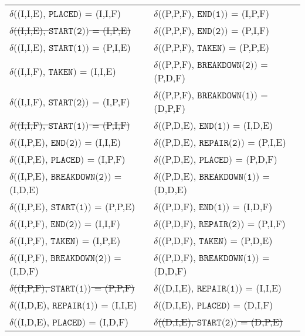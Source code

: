 \begin{table}\centering
  \begin{tabular}{ll}
    $\delta$((I,I,E), $\texttt{PLACED})$ = (I,I,F)       & $\delta$((P,P,F), $\texttt{END(1)})$ = (I,P,F)       \\
    \sout{$\delta$((I,I,E), $\texttt{START(2)})$ = (I,P,E)}     & $\delta$((P,P,F), $\texttt{END(2)})$ = (P,I,F)       \\
    $\delta$((I,I,E), $\texttt{START(1)})$ = (P,I,E)     & $\delta$((P,P,F), $\texttt{TAKEN})$ = (P,P,E)        \\
    $\delta$((I,I,F), $\texttt{TAKEN})$ = (I,I,E)        & $\delta$((P,P,F), $\texttt{BREAKDOWN(2)})$ = (P,D,F) \\
    $\delta$((I,I,F), $\texttt{START(2)})$ = (I,P,F)     & $\delta$((P,P,F), $\texttt{BREAKDOWN(1)})$ = (D,P,F) \\
    \sout{$\delta$((I,I,F), $\texttt{START(1)})$ = (P,I,F)}     & $\delta$((P,D,E), $\texttt{END(1)})$ = (I,D,E)       \\
    $\delta$((I,P,E), $\texttt{END(2)})$ = (I,I,E)       & $\delta$((P,D,E), $\texttt{REPAIR(2)})$ = (P,I,E)    \\
    $\delta$((I,P,E), $\texttt{PLACED})$ = (I,P,F)       & $\delta$((P,D,E), $\texttt{PLACED})$ = (P,D,F)       \\
    $\delta$((I,P,E), $\texttt{BREAKDOWN(2)})$ = (I,D,E) & $\delta$((P,D,E), $\texttt{BREAKDOWN(1)})$ = (D,D,E) \\
    $\delta$((I,P,E), $\texttt{START(1)})$ = (P,P,E)     & $\delta$((P,D,F), $\texttt{END(1)})$ = (I,D,F)       \\
    $\delta$((I,P,F), $\texttt{END(2)})$ = (I,I,F)       & $\delta$((P,D,F), $\texttt{REPAIR(2)})$ = (P,I,F)    \\
    $\delta$((I,P,F), $\texttt{TAKEN})$ = (I,P,E)        & $\delta$((P,D,F), $\texttt{TAKEN})$ = (P,D,E)         \\
    $\delta$((I,P,F), $\texttt{BREAKDOWN(2)})$ = (I,D,F) & $\delta$((P,D,F), $\texttt{BREAKDOWN(1)})$ = (D,D,F)  \\
    \sout{$\delta$((I,P,F), $\texttt{START(1)})$ = (P,P,F)}    & $\delta$((D,I,E), $\texttt{REPAIR(1)})$ = (I,I,E)     \\
    $\delta$((I,D,E), $\texttt{REPAIR(1)})$ = (I,I,E)    & $\delta$((D,I,E), $\texttt{PLACED})$ = (D,I,F)        \\
    $\delta$((I,D,E), $\texttt{PLACED})$ = (I,D,F)       & \sout{$\delta$((D,I,E), $\texttt{START(2)})$ = (D,P,E)}      \\

\end{tabular}
\end{table}
